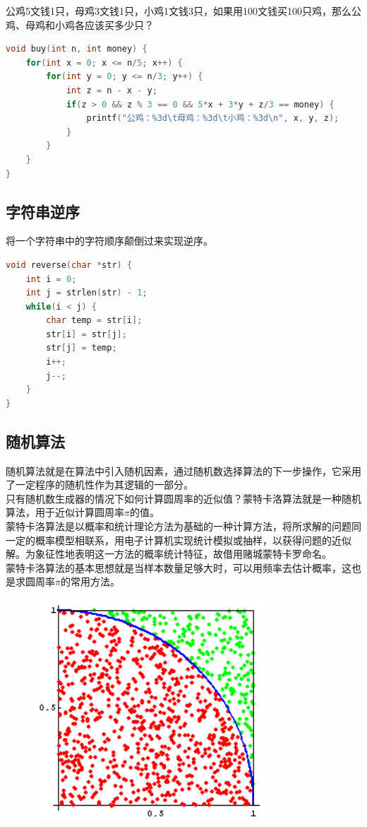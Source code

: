 公鸡5文钱1只，母鸡3文钱1只，小鸡1文钱3只，如果用100文钱买100只鸡，那么公鸡、母鸡和小鸡各应该买多少只？

\begin{lstlisting}[language=C]
void buy(int n, int money) {
	for(int x = 0; x <= n/5; x++) {
		for(int y = 0; y <= n/3; y++) {
			int z = n - x - y;
			if(z > 0 && z % 3 == 0 && 5*x + 3*y + z/3 == money) {
				printf("公鸡：%3d\t母鸡：%3d\t小鸡：%3d\n", x, y, z);
			}
		}
	}
}
\end{lstlisting}

\subsection{字符串逆序}

将一个字符串中的字符顺序颠倒过来实现逆序。 \\


\begin{lstlisting}[language=C]
void reverse(char *str) {
	int i = 0;
	int j = strlen(str) - 1;
	while(i < j) {
		char temp = str[i];
		str[i] = str[j];
		str[j] = temp;
		i++;
		j--;
	}
}
\end{lstlisting}

\subsection{随机算法}

随机算法就是在算法中引入随机因素，通过随机数选择算法的下一步操作，它采用了一定程序的随机性作为其逻辑的一部分。 \\

只有随机数生成器的情况下如何计算圆周率的近似值？蒙特卡洛算法就是一种随机算法，用于近似计算圆周率$ \pi $的值。 \\

蒙特卡洛算法是以概率和统计理论方法为基础的一种计算方法，将所求解的问题同一定的概率模型相联系，用电子计算机实现统计模拟或抽样，以获得问题的近似解。为象征性地表明这一方法的概率统计特征，故借用赌城蒙特卡罗命名。 \\

蒙特卡洛算法的基本思想就是当样本数量足够大时，可以用频率去估计概率，这也是求圆周率$ \pi $的常用方法。

\begin{figure}[H]
	\centering
	\includegraphics[]{img/C1/1-3/1.png}
\end{figure}

